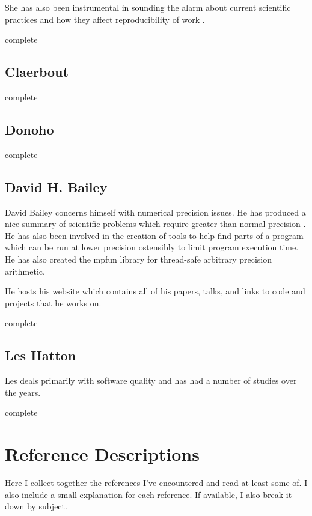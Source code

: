 \documentclass[american]{article}
\newcommand{\complete}{
	\gls{complete}
}
\begin{document}
She has also been instrumental in sounding the alarm about current scientific practices and how they affect reproducibility of work \cite{stodden-reproducibility-crisis}.

\complete

\subsection{Claerbout} \label{sec:authors-claerbout}

\complete

\subsection{Donoho} \label{sec:authors-donoho}

\complete

\subsection{David H. Bailey} \label{sec:authors-bailey}

David Bailey concerns himself with numerical precision issues. He has produced a nice summary of scientific problems which require greater than normal precision \cite{high-precision-arith-in-science,dhb-zurich-hp}. He has also been involved in the creation of tools to help find parts of a program which can be run at lower precision ostensibly to limit program execution time\cite{blame-analysis}. He has also created the mpfun library for thread-safe arbitrary precision arithmetic\cite{mpfun}.

He hosts his website\cite{david-bailey-site} which contains all of his papers, talks, and links to code and projects that he works on.

\complete

\subsection{Les Hatton} \label{sec:authors-hatton}

Les deals primarily with software quality and has had a number of studies over the years.

\complete

\section{Reference Descriptions} \label{sec:reference-descriptions}

Here I collect together the references I've encountered and read at least some of. I also include a small explanation for each reference. If available, I also break it down by subject.
\end{document}
